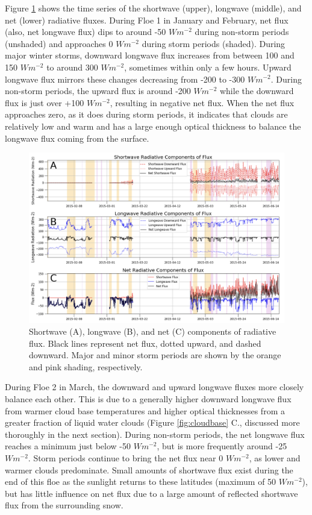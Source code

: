 Figure \ref{fig:flux:all} shows the time series of the shortwave (upper), longwave (middle), and net (lower) radiative fluxes. During Floe 1 in January and February, net flux (also, net longwave flux) dips to around -50 $W m^{-2}$ during non-storm periods (unshaded) and approaches 0 $W m^{-2}$ during storm periods (shaded). During major winter storms, downward longwave flux increases from between 100 and 150 $W m^{-2}$ to around 300 $W m^{-2}$, sometimes within only a few hours. Upward longwave flux mirrors these changes decreasing from -200 to -300 $W m^{-2}$. During non-storm periods, the upward flux is around -200 $W m^{-2}$ while the downward flux is just over +100 $W m^{-2}$, resulting in negative net flux. When the net flux approaches zero, as it does during storm periods, it indicates that clouds are relatively low and warm and has a large enough optical thickness to balance the longwave flux coming from the surface.

\begin{figure}[H]
    \centering
    \includegraphics[width=1\linewidth]{figures/chapter4/ch2_f3.png}
    \caption[Shortwave, longwave, and net radiative components of flux.]{Shortwave (A), longwave (B), and net (C) components of radiative flux. Black lines represent net flux, dotted upward, and dashed downward. Major and minor storm periods are shown by the orange and pink shading, respectively.}
    \label{fig:flux:all}
\end{figure}

During Floe 2 in March, the downward and upward longwave fluxes more closely balance each other. This is due to a generally higher downward longwave flux from warmer cloud base temperatures and higher optical thicknesses from a greater fraction of liquid water clouds (Figure \ref{fig:cloudbase} C., discussed more thoroughly in the next section). During non-storm periods, the net longwave flux reaches a minimum just below -50 $W m^{-2}$, but is more frequently around -25 $W m^{-2}$. Storm periods continue to bring the net flux near 0 $W m^{-2}$, as lower and warmer clouds predominate. Small amounts of shortwave flux exist during the end of this floe as the sunlight returns to these latitudes (maximum of 50 $W m^{-2}$), but has little influence on net flux due to a large amount of reflected shortwave flux from the surrounding snow.

